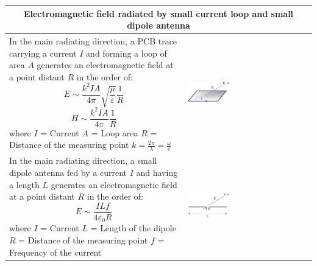 		\begin{table}[h!]
		\centering
		\begin{tabular}{|m{}|m{}|}
				\multicolumn{2}{c}{\textbf{Electromagnetic field radiated by small current loop and small dipole antenna}}
			\\
			\hline
				In the main radiating direction, a PCB trace carrying a current $I$ and forming a loop of area $A$ generates an electromagnetic field at a point distant $R$ in the order of:\newline
				\begin{equation}
					E \sim \frac{k^2 I A}{4\pi} \sqrt{\frac{\mu}{\varepsilon}}\frac{1}{R}
				\end{equation}
				\begin{equation}
					H \sim \frac{k^2 I A}{4\pi}\frac{1}{R}
				\end{equation}
				where\newline
				$I$ = Current\newline
				$A$ = Loop area\newline
				$R$ = Distance of the measuring point \newline
				$k = \frac{2\pi}{\lambda} = \frac{\omega}{c}$ 
			& 
				 \begin{center}\includegraphics[width=0.35\textwidth]{images/CurrentLoop.png}\end{center}  
			\\
			\hline
				In the main radiating direction, a small dipole antenna fed by a current $I$ and having a length $L$ generates an electromagnetic field at a point distant $R$ in the order of: \newline
				\begin{equation}
					E \sim \frac{I L f}{4\varepsilon_0 R}
				\end{equation}
				where\newline
				$I$ = Current\newline
				$L$ = Length of the dipole\newline
				$R$ = Distance of the measuring point \newline
				$f$ = Frequency of the current				
			& 
				 \begin{center}\includegraphics[width=0.35\textwidth]{images/DipoleAntenna.png}\end{center}  
			\\
			\hline
			\end{tabular}
		\end{table}	
		
